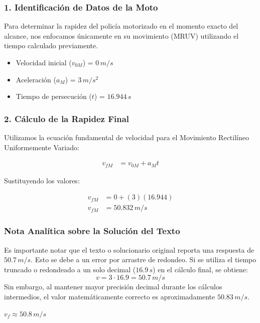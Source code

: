 \documentclass[12pt, a4paper]{article}
\begin{document}
\subsubsection*{1. Identificación de Datos de la Moto}
Para determinar la rapidez del policía motorizado en el momento exacto del alcance, nos enfocamos únicamente en su movimiento (MRUV) utilizando el tiempo calculado previamente.
\begin{itemize}
\item Velocidad inicial ($v_{0M}$) = $0 \, \si{m/s}$
\item Aceleración ($a_M$) = $3 \, \si{m/s^2}$
\item Tiempo de persecución ($t$) = $16.944 \, \si{s}$
\end{itemize}

\subsubsection*{2. Cálculo de la Rapidez Final}
Utilizamos la ecuación fundamental de velocidad para el Movimiento Rectilíneo Uniformemente Variado:

\begin{align*}
v_{fM} &= v_{0M} + a_M t
\end{align*}

Sustituyendo los valores:

\begin{align*}
v_{fM} &= 0 + (3)(16.944) \\
v_{fM} &= 50.832 \, \si{m/s}
\end{align*}

\subsubsection*{Nota Analítica sobre la Solución del Texto}
Es importante notar que el texto o solucionario original reporta una respuesta de $50.7 \, \si{m/s}$. Esto se debe a un error por arrastre de redondeo. Si se utiliza el tiempo truncado o redondeado a un solo decimal ($16.9 \, \si{s}$) en el cálculo final, se obtiene:
$$ v = 3 \cdot 16.9 = 50.7 \, \si{m/s} $$
Sin embargo, al mantener mayor precisión decimal durante los cálculos intermedios, el valor matemáticamente correcto es aproximadamente $50.83 \, \si{m/s}$.

\begin{tcolorbox}[colback=green!5!white, colframe=green!50!black, title=Respuesta Final]
\centering \Large $v_{f} \approx 50.8 \, \si{m/s}$
\end{tcolorbox}
\end{document}

